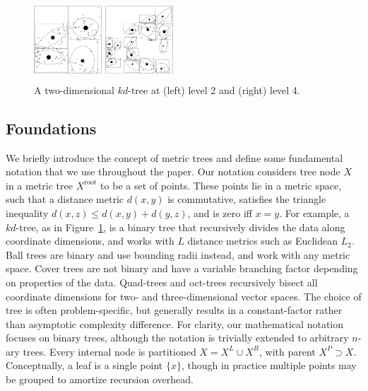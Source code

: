 \documentclass[twoside,leqno,twocolumn]{article}
\newcommand{\union}{\cup}
\newcommand{\fig}[1]{Figure~\ref{fig:#1}}
\newcommand{\mysub}[1]{\subsection{#1} }
\newcommand{\kdroot}[1]{#1^{\text{root}}}
\newcommand{\kdleft}[1]{#1^{\!L}}
\newcommand{\kdright}[1]{#1^{\!R}}
\newcommand{\kdparent}[1]{#1^{\!P}}
\newcommand{\dist}[2]{d(#1,#2)}
\begin{document}
\begin{figure}[t]
  \centering
  \begin{minipage}{3.2in}
    \begin{minipage}{1.05in}
      \includegraphics[width=1.0in,height=1.2in]{kdtree-level2.ps}
    \end{minipage}
    \begin{minipage}{1.05in}
      \includegraphics[width=1.0in,height=1.2in]{kdtree-level4.ps}
    \end{minipage}
    \begin{minipage}{1.0in}
      \footnotesize{\caption{\label{fig:kdtree} A two-dimensional
          $kd$-tree at (left) level 2 and (right) level 4.}}
    \end{minipage}
  \end{minipage}
\end{figure}


\mysub{Foundations}
We briefly introduce the concept of metric trees and define some fundamental notation that we use throughout the paper.
Our notation considers tree node $X$ in a metric tree $\kdroot{X}$ to be a set of points.
These points lie in a metric space, such that a distance metric $\dist{x}{y}$ is commutative, satisfies the triangle inequality $\dist{x}{z} \leq \dist{x}{y} + \dist{y}{z}$, and is zero iff $x = y$.
For example, a $kd$-tree\cite{preparata_kdtrees}, as in \fig{kdtree}, is a binary tree that recursively divides the data along coordinate dimensions, and works with $L$ distance metrics such as Euclidean $L_2$.
Ball trees are binary and use bounding radii instead, and work with any metric space.
Cover trees are not binary and have a variable branching factor depending on properties of the data.
Quad-trees and oct-trees recursively bisect all coordinate dimensions for two- and three-dimensional vector spaces.
The choice of tree is often problem-specific, but generally results in a constant-factor rather than asymptotic complexity difference.
For clarity, our mathematical notation focuses on binary trees, although the notation is trivially extended to arbitrary $n$-ary trees.
Every internal node is partitioned $X = \kdleft{X} \union \kdright{X}$, with parent $\kdparent{X} \supset X$.
Conceptually, a leaf is a single point $\{x\}$, though in practice multiple points may be grouped to amortize recursion overhead.
\end{document}
